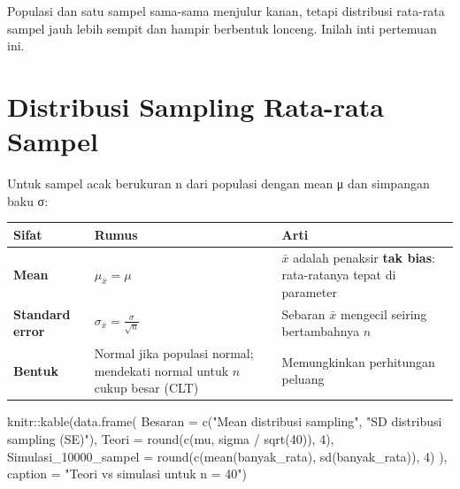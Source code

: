 \documentclass[
  indonesian,
  letterpaper,
]{book}
\newenvironment{Shaded}{\begin{snugshade}}{\end{snugshade}}
\newcommand{\AttributeTok}[1]{\textcolor[rgb]{0.40,0.45,0.13}{#1}}
\newcommand{\DecValTok}[1]{\textcolor[rgb]{0.68,0.00,0.00}{#1}}
\newcommand{\FunctionTok}[1]{\textcolor[rgb]{0.28,0.35,0.67}{#1}}
\newcommand{\NormalTok}[1]{\textcolor[rgb]{0.00,0.23,0.31}{#1}}
\newcommand{\SpecialCharTok}[1]{\textcolor[rgb]{0.37,0.37,0.37}{#1}}
\newcommand{\StringTok}[1]{\textcolor[rgb]{0.13,0.47,0.30}{#1}}
\newcounter{none} %
\begin{document}
Populasi dan satu sampel sama-sama menjulur kanan, tetapi distribusi
rata-rata sampel jauh lebih sempit dan hampir berbentuk lonceng. Inilah
inti pertemuan ini.


\chapter{Distribusi Sampling Rata-rata
Sampel}\label{distribusi-sampling-rata-rata-sampel}

Untuk sampel acak berukuran n dari populasi dengan mean μ dan simpangan
baku σ:

{\def\LTcaptype{none} %
\begin{longtable}[]{@{}
  >{\raggedright\arraybackslash}p{}
  >{\raggedright\arraybackslash}p{}
  >{\raggedright\arraybackslash}p{}@{}}
\toprule\noalign{}
\begin{minipage}[b]{\linewidth}\raggedright
Sifat
\end{minipage} & \begin{minipage}[b]{\linewidth}\raggedright
Rumus
\end{minipage} & \begin{minipage}[b]{\linewidth}\raggedright
Arti
\end{minipage} \\
\midrule\noalign{}
\endhead
\bottomrule\noalign{}
\endlastfoot
\textbf{Mean} & \(\mu_{\bar{x}} = \mu\) & \(\bar{x}\) adalah penaksir
\textbf{tak bias}: rata-ratanya tepat di parameter \\
\textbf{Standard error} & \(\sigma_{\bar{x}} = \frac{\sigma}{\sqrt{n}}\)
& Sebaran \(\bar{x}\) mengecil seiring bertambahnya \(n\) \\
\textbf{Bentuk} & Normal jika populasi normal; mendekati normal untuk
\(n\) cukup besar (CLT) & Memungkinkan perhitungan peluang \\
\end{longtable}
}

\begin{Shaded}
\begin{Highlighting}[]
\NormalTok{knitr}\SpecialCharTok{::}\FunctionTok{kable}\NormalTok{(}\FunctionTok{data.frame}\NormalTok{(}
\AttributeTok{Besaran =} \FunctionTok{c}\NormalTok{(}\StringTok{"Mean distribusi sampling"}\NormalTok{, }\StringTok{"SD distribusi sampling (SE)"}\NormalTok{),}
\AttributeTok{Teori =} \FunctionTok{round}\NormalTok{(}\FunctionTok{c}\NormalTok{(mu, sigma }\SpecialCharTok{/} \FunctionTok{sqrt}\NormalTok{(}\DecValTok{40}\NormalTok{)), }\DecValTok{4}\NormalTok{),}
\AttributeTok{Simulasi\_10000\_sampel =} \FunctionTok{round}\NormalTok{(}\FunctionTok{c}\NormalTok{(}\FunctionTok{mean}\NormalTok{(banyak\_rata), }\FunctionTok{sd}\NormalTok{(banyak\_rata)), }\DecValTok{4}\NormalTok{)}
\NormalTok{), }\AttributeTok{caption =} \StringTok{"Teori vs simulasi untuk n = 40"}\NormalTok{)}
\end{Highlighting}
\end{Shaded}
\end{document}
